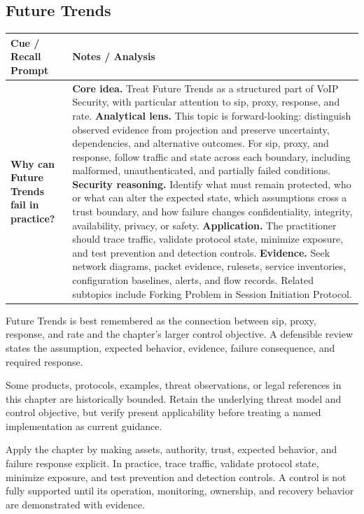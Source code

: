 \documentclass[11pt]{article}
\newcommand{\CornellHeader}{%
\rowcolor{Navy}\color{white}\bfseries Cue / Recall Prompt & \color{white}\bfseries Notes / Analysis\\\hline}
\newcommand{\CornellRow}[2]{%
\cellcolor{CueGray}\RaggedRight\textbf{#1} & \RaggedRight #2\\\hline}
\begin{document}
\subsection*{Future Trends}
\begin{longtable}{>{\RaggedRight\arraybackslash}p{}|>{\RaggedRight\arraybackslash}p{}}
\CornellHeader
\CornellRow{Why can Future Trends fail in practice?}{\textbf{Core idea.} Treat Future Trends as a structured part of VoIP Security, with particular attention to sip, proxy, response, and rate. \textbf{Analytical lens.} This topic is forward-looking: distinguish observed evidence from projection and preserve uncertainty, dependencies, and alternative outcomes. For sip, proxy, and response, follow traffic and state across each boundary, including malformed, unauthenticated, and partially failed conditions. \textbf{Security reasoning.} Identify what must remain protected, who or what can alter the expected state, which assumptions cross a trust boundary, and how failure changes confidentiality, integrity, availability, privacy, or safety. \textbf{Application.} The practitioner should trace traffic, validate protocol state, minimize exposure, and test prevention and detection controls. \textbf{Evidence.} Seek network diagrams, packet evidence, rulesets, service inventories, configuration baselines, alerts, and flow records. Related subtopics include Forking Problem in Session Initiation Protocol.}
\end{longtable}
\begin{topicsummary}
Future Trends is best remembered as the connection between sip, proxy, response, and rate and the chapter's larger control objective. A defensible review states the assumption, expected behavior, evidence, failure consequence, and required response.
\end{topicsummary}
\begin{historybox}
Some products, protocols, examples, threat observations, or legal references in this chapter are historically bounded. Retain the underlying threat model and control objective, but verify present applicability before treating a named implementation as current guidance.
\end{historybox}
\begin{defensebox}
Apply the chapter by making assets, authority, trust, expected behavior, and failure response explicit. In practice, trace traffic, validate protocol state, minimize exposure, and test prevention and detection controls. A control is not fully supported until its operation, monitoring, ownership, and recovery behavior are demonstrated with evidence.
\end{defensebox}
\end{document}
